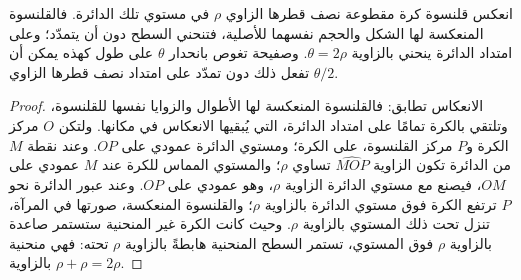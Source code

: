 \begin{proposition}\label{prop:b1:active-margins:shell}
انعكس قلنسوة كرة مقطوعة  نصف قطرها الزاوي $\rho$ في مستوي تلك الدائرة. فالقلنسوة المنعكسة لها الشكل والحجم نفسهما للأصلية، فتنحني السطح دون أن يتمدّد؛ وعلى امتداد الدائرة ينحني بالزاوية $\theta = 2\rho$. وصفيحة تغوص بانحدار $\theta$ على طول  كهذه يمكن أن تفعل ذلك دون تمدّد على امتداد  نصف قطرها الزاوي $\theta/2$.
\end{proposition}

\begin{proof}
الانعكاس تطابق: فالقلنسوة المنعكسة لها الأطوال والزوايا نفسها للقلنسوة، وتلتقي بالكرة تمامًا على امتداد الدائرة، التي يُبقيها الانعكاس في مكانها. ولتكن $O$ مركز الكرة و$P$ مركز القلنسوة، على الكرة؛ ومستوي الدائرة عمودي على $OP$. وعند نقطة $M$ من الدائرة تكون الزاوية $\widehat{MOP}$ تساوي $\rho$؛ والمستوي المماس للكرة عند $M$ عمودي على $OM$، فيصنع مع مستوي الدائرة الزاوية $\rho$، وهو عمودي على $OP$.
وعند عبور الدائرة نحو $P$ ترتفع الكرة فوق مستوي الدائرة بالزاوية $\rho$؛ والقلنسوة المنعكسة، صورتها في المرآة، تنزل تحت ذلك المستوي بالزاوية $\rho$. وحيث كانت الكرة غير المنحنية ستستمر صاعدة بالزاوية $\rho$ فوق المستوي، تستمر السطح المنحنية هابطةً بالزاوية $\rho$ تحته: فهي منحنية بالزاوية $\rho + \rho = 2\rho$.
\end{proof}

